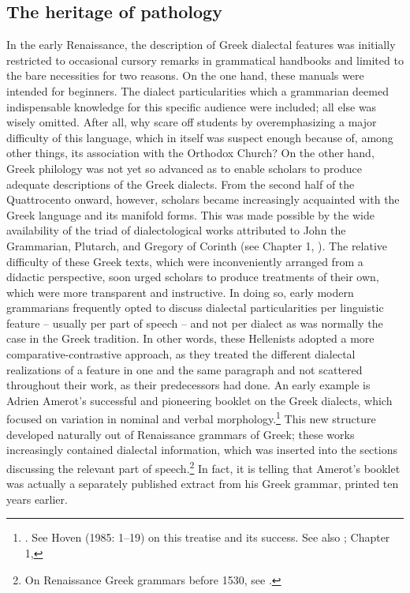 \documentclass[output=paper]{langsci/langscibook}
\begin{document}
\subsection{The heritage of pathology}
\hypertarget{Toc19704845}{}
In the early Renaissance, the description of Greek dialectal features was initially restricted to occasional cursory remarks in grammatical handbooks and limited to the bare necessities for two reasons. On the one hand, these manuals were intended for beginners. The dialect particularities which a grammarian deemed indispensable knowledge for this specific audience were included; all else was wisely omitted. After all, why scare off students by overemphasizing a major difficulty of this language, which in itself was suspect enough because of, among other things, its association with the Orthodox Church? On the other hand, Greek philology was not yet so advanced as to enable scholars to produce adequate descriptions of the Greek dialects. From the second half of the Quattrocento onward, however, scholars became increasingly acquainted with the Greek language and its manifold forms. This was made possible by the wide availability of the triad of dialectological works attributed to John the Grammarian, Plutarch, and Gregory of Corinth (see Chapter 1, ). The relative difficulty of these Greek texts, which were inconveniently arranged from a didactic perspective, soon urged scholars to produce treatments of their own, which were more transparent and instructive. In doing so, early modern grammarians frequently opted to discuss dialectal particularities per linguistic feature – usually per part of speech – and not per dialect as was normally the case in the Greek tradition. In other words, these Hellenists adopted a more comparative-contrastive approach, as they treated the different dialectal realizations of a feature in one and the same paragraph and not scattered throughout their work, as their predecessors had done. An early example is Adrien Amerot’s successful and pioneering booklet on the Greek dialects, which focused on variation in nominal and verbal morphology.\footnote{ \textrm{\citet{Amerot1530}. See Hoven (1985: 1–19) on this treatise and its success. See also \citet{Hummel1999}; Chapter 1, }} This new structure developed naturally out of Renaissance grammars of Greek; these works increasingly contained dialectal information, which was inserted into the sections discussing the relevant part of speech.\footnote{ \textrm{On Renaissance Greek grammars before 1530, see \citet{Botley2010}.}} In fact, it is telling that Amerot’s booklet was actually a separately published extract from his Greek grammar, printed ten years earlier.
\end{document}
